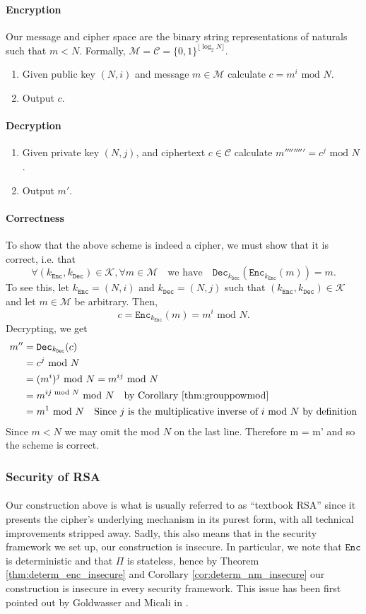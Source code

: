 \documentclass{article}
\theoremstyle{definition}
\theoremstyle{example}
\newcommand{\Enc}{\texttt{Enc}}
\newcommand{\Dec}{\texttt{Dec}}
\newcommand{\M}{\mathcal{M}}
\renewcommand{\C}{\mathcal{C}}
\newcommand{\K}{\mathcal{K}}
\renewcommand{\mod}{\,\,\text{mod}\,\,}
\begin{document}
\paragraph{Encryption}
Our message and cipher space are the binary string representations of naturals such that $m
< N$. Formally, $\M = \C = \{0, 1\}^{\lfloor {\log_2N} \rfloor}$.
\begin{enumerate}
\item Given public key $(N, i)$ and message $m \in \M$ calculate $c = m^i \mod N$.
\item Output $c$.
\end{enumerate}
\paragraph{Decryption}
\begin{enumerate}
\item Given private key $(N, j)$, and ciphertext $c \in \C$ calculate $m'''''''''= c^j \mod
  N$.
\item Output $m'$.
\end{enumerate}
\paragraph{Correctness} To show that the above scheme is indeed a cipher, we
must show that it is correct, i.e. that
\[
  \forall (k_\Enc, k_\Dec) \in \K, \forall m \in \M\quad\text{we have}\quad
  \Dec_{k_\Dec}(\Enc_{k_\Enc}(m)) = m.
\]
To see this, let $k_\Enc = (N, i)$ and $k_\Dec = (N, j)$ such that $(k_\Enc,
k_\Dec) \in \K$ and let $m \in \M$ be arbitrary. Then,
\[
  c = \Enc_{k_\Enc}(m) = m^i \mod N.
\]
Decrypting, we get
\begin{align*}
  m'' &= \Dec_{k_\Dec}(c) \\
     &= c^j \mod N \\
     &= (m^i)^j \mod N = m^{ij} \mod N \\
     &= m^{ij \mod N} \mod N \quad \text{by Corollary \ref{thm:grouppowmod}} \\
     &= m^1 \mod N \quad \text{Since $j$ is the multiplicative inverse of $i$ mod $N$ by definition}
\end{align*}
Since $m < N$ we may omit the mod $N$ on the last line. Therefore m = m' and so the scheme is correct.
\subsubsection{Security of RSA}
\paragraph{} Our construction above is what is usually referred to as ``textbook
RSA'' since it presents the cipher's underlying mechanism in its purest form,
with all technical improvements stripped away. Sadly, this also means that in
the security framework we set up, our construction is insecure. In particular, we note that
$\Enc$ is deterministic and that $\Pi$ is stateless, hence by Theorem
\ref{thm:determ_enc_insecure} and Corollary \ref{cor:determ_nm_insecure} our
construction is insecure in every security framework. This issue has been first
pointed out by Goldwasser and Micali in \cite{goldwasser1984probabilistic}. 
\end{document}
